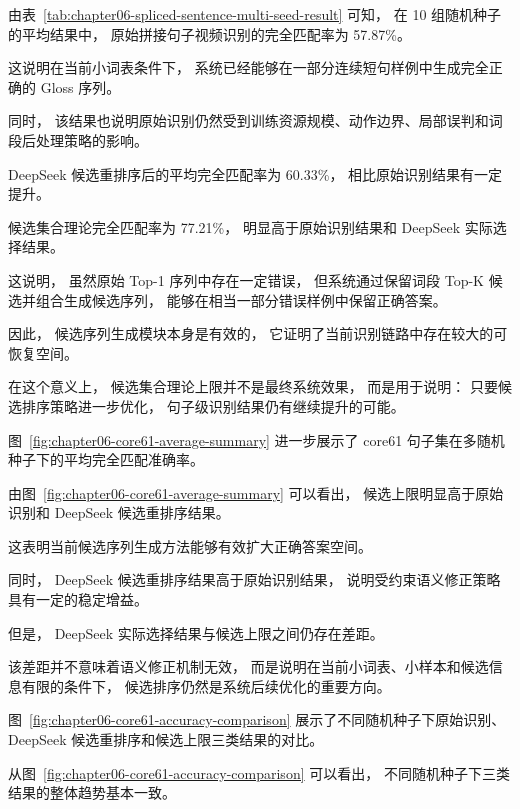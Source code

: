 由表~\ref{tab:chapter06-spliced-sentence-multi-seed-result} 可知，
在 10 组随机种子的平均结果中，
原始拼接句子视频识别的完全匹配率为 57.87\%。

这说明在当前小词表条件下，
系统已经能够在一部分连续短句样例中生成完全正确的 Gloss 序列。

同时，
该结果也说明原始识别仍然受到训练资源规模、动作边界、局部误判和词段后处理策略的影响。

DeepSeek 候选重排序后的平均完全匹配率为 60.33\%，
相比原始识别结果有一定提升。

候选集合理论完全匹配率为 77.21\%，
明显高于原始识别结果和 DeepSeek 实际选择结果。

这说明，
虽然原始 Top-1 序列中存在一定错误，
但系统通过保留词段 Top-K 候选并组合生成候选序列，
能够在相当一部分错误样例中保留正确答案。

因此，
候选序列生成模块本身是有效的，
它证明了当前识别链路中存在较大的可恢复空间。

在这个意义上，
候选集合理论上限并不是最终系统效果，
而是用于说明：
只要候选排序策略进一步优化，
句子级识别结果仍有继续提升的可能。

图~\ref{fig:chapter06-core61-average-summary} 进一步展示了 core61 句子集在多随机种子下的平均完全匹配准确率。


由图~\ref{fig:chapter06-core61-average-summary} 可以看出，
候选上限明显高于原始识别和 DeepSeek 候选重排序结果。

这表明当前候选序列生成方法能够有效扩大正确答案空间。

同时，
DeepSeek 候选重排序结果高于原始识别结果，
说明受约束语义修正策略具有一定的稳定增益。

但是，
DeepSeek 实际选择结果与候选上限之间仍存在差距。

该差距并不意味着语义修正机制无效，
而是说明在当前小词表、小样本和候选信息有限的条件下，
候选排序仍然是系统后续优化的重要方向。

图~\ref{fig:chapter06-core61-accuracy-comparison} 展示了不同随机种子下原始识别、DeepSeek 候选重排序和候选上限三类结果的对比。


从图~\ref{fig:chapter06-core61-accuracy-comparison} 可以看出，
不同随机种子下三类结果的整体趋势基本一致。

